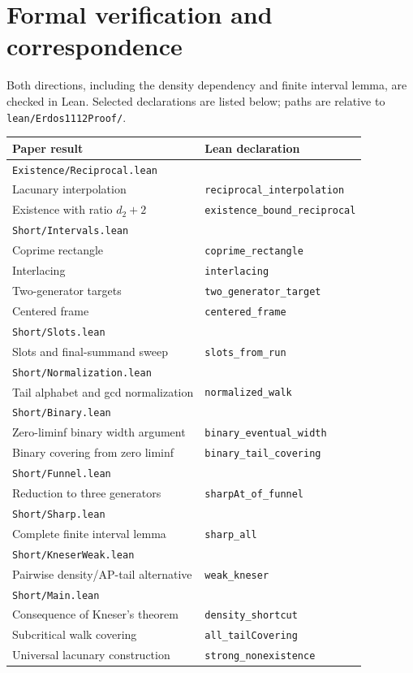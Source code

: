 \documentclass[11pt,a4paper,reqno]{amsart}
\theoremstyle{definition}
\theoremstyle{remark}
\begin{document}
\section{Formal verification and correspondence}\label{sec:formal}
Both directions, including the density dependency and finite interval lemma,
are checked in Lean. Selected declarations are listed below; paths are relative
to \texttt{lean/Erdos1112Proof/}.
\begin{center}\small
\begin{tabular}{ll}
\toprule
Paper result & Lean declaration\\
\midrule
\multicolumn{2}{l}{\texttt{Existence/Reciprocal.lean}}\\
Lacunary interpolation & \texttt{reciprocal\_interpolation}\\
Existence with ratio $d_2+2$ & \texttt{existence\_bound\_reciprocal}\\
\multicolumn{2}{l}{\texttt{Short/Intervals.lean}}\\
Coprime rectangle & \texttt{coprime\_rectangle}\\
Interlacing & \texttt{interlacing}\\
Two-generator targets & \texttt{two\_generator\_target}\\
Centered frame & \texttt{centered\_frame}\\
\multicolumn{2}{l}{\texttt{Short/Slots.lean}}\\
Slots and final-summand sweep & \texttt{slots\_from\_run}\\
\multicolumn{2}{l}{\texttt{Short/Normalization.lean}}\\
Tail alphabet and gcd normalization & \texttt{normalized\_walk}\\
\multicolumn{2}{l}{\texttt{Short/Binary.lean}}\\
Zero-liminf binary width argument & \texttt{binary\_eventual\_width}\\
Binary covering from zero liminf & \texttt{binary\_tail\_covering}\\
\multicolumn{2}{l}{\texttt{Short/Funnel.lean}}\\
Reduction to three generators & \texttt{sharpAt\_of\_funnel}\\
\multicolumn{2}{l}{\texttt{Short/Sharp.lean}}\\
Complete finite interval lemma & \texttt{sharp\_all}\\
\multicolumn{2}{l}{\texttt{Short/KneserWeak.lean}}\\
Pairwise density/AP-tail alternative & \texttt{weak\_kneser}\\
\multicolumn{2}{l}{\texttt{Short/Main.lean}}\\
Consequence of Kneser's theorem & \texttt{density\_shortcut}\\
Subcritical walk covering & \texttt{all\_tailCovering}\\
Universal lacunary construction & \texttt{strong\_nonexistence}\\
\bottomrule
\end{tabular}
\end{center}
\end{document}
